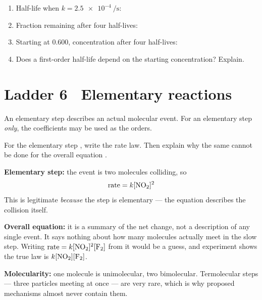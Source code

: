 \documentclass{apchem-worksheet}
\begin{document}
\begin{yourturn}
\begin{enumerate}[leftmargin=*,itemsep=0.5em]
  \item Half-life when $k = \SI{2.5e-4}{\per\second}$:
        \workspace[1.6cm]
  \item Fraction remaining after four half-lives: \workspace[1.4cm]
  \item Starting at \SI{0.600}{\Molar}, concentration after four
        half-lives: \workspace[1.6cm]
  \item Does a first-order half-life depend on the starting
        concentration? Explain. \workspace[1.8cm]
\end{enumerate}
\end{yourturn}

\section*{\sffamily Ladder 6 \textbullet\ Elementary reactions}

An elementary step describes an actual molecular event. For an elementary
step \emph{only}, the coefficients may be used as the orders.

\begin{workedexample}
For the elementary step , write the rate law. Then
explain why the same cannot be done for the overall equation
.

\textbf{Elementary step:} the event is two  molecules colliding,
so
\[ \text{rate} = k[\ce{NO2}]^2 \]
This is legitimate \emph{because} the step is elementary --- the equation
describes the collision itself.

\textbf{Overall equation:} it is a summary of the net change, not a
description of any single event. It says nothing about how many molecules
actually meet in the slow step. Writing
$\text{rate} = k[\ce{NO2}]^2[\ce{F2}]$ from it would be a guess, and
experiment shows the true law is $k[\ce{NO2}][\ce{F2}]$.

\textbf{Molecularity:} one molecule is unimolecular, two bimolecular.
Termolecular steps --- three particles meeting at once --- are very rare,
which is why proposed mechanisms almost never contain them.
\end{workedexample}
\end{document}
